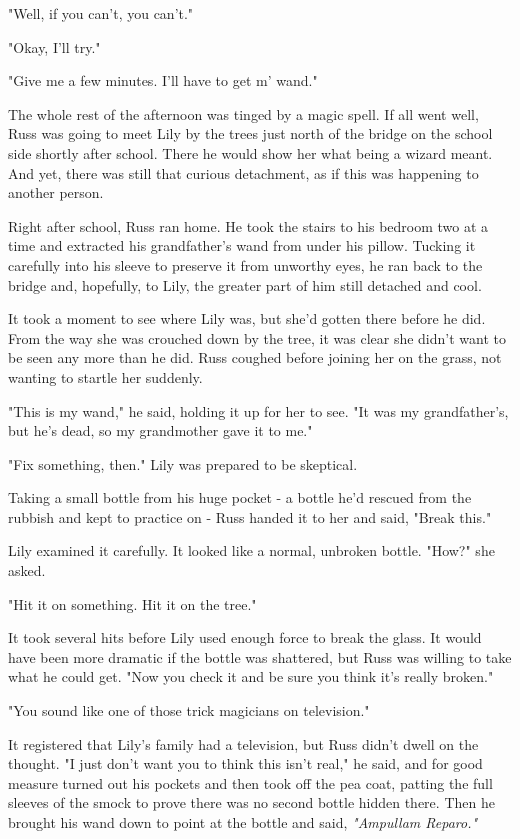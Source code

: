 \documentclass[a4paper,11pt]{article}
\begin{document}
"Well, if you can't, you can't."

"Okay, I'll try."

"Give me a few minutes. I'll have to get m' wand."

The whole rest of the afternoon was tinged by a magic spell. If all went well, Russ was going to meet Lily by the trees just north of the bridge on the school side shortly after school. There he would show her what being a wizard meant. And yet, there was still that curious detachment, as if this was happening to another person.

Right after school, Russ ran home. He took the stairs to his bedroom two at a time and extracted his grandfather's wand from under his pillow. Tucking it carefully into his sleeve to preserve it from unworthy eyes, he ran back to the bridge and, hopefully, to Lily, the greater part of him still detached and cool.

It took a moment to see where Lily was, but she'd gotten there before he did. From the way she was crouched down by the tree, it was clear she didn't want to be seen any more than he did. Russ coughed before joining her on the grass, not wanting to startle her suddenly.

"This is my wand," he said, holding it up for her to see. "It was my grandfather's, but he's dead, so my grandmother gave it to me."

"Fix something, then." Lily was prepared to be skeptical.

Taking a small bottle from his huge pocket - a bottle he'd rescued from the rubbish and kept to practice on - Russ handed it to her and said, "Break this."

Lily examined it carefully. It looked like a normal, unbroken bottle. "How?" she asked.

"Hit it on something. Hit it on the tree."

It took several hits before Lily used enough force to break the glass. It would have been more dramatic if the bottle was shattered, but Russ was willing to take what he could get. "Now you check it and be sure you think it's really broken."

"You sound like one of those trick magicians on television."

It registered that Lily's family had a television, but Russ didn't dwell on the thought. "I just don't want you to think this isn't real," he said, and for good measure turned out his pockets and then took off the pea coat, patting the full sleeves of the smock to prove there was no second bottle hidden there. Then he brought his wand down to point at the bottle and said, \emph{"Ampullam Reparo."}
\end{document}
